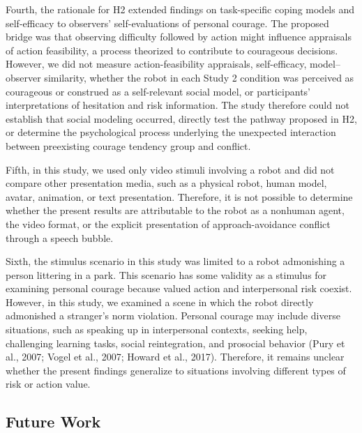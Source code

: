 \documentclass[
]{article}
\begin{document}
Fourth, the rationale for H2 extended findings on task-specific coping
models and self-efficacy to observers' self-evaluations of personal
courage. The proposed bridge was that observing difficulty followed by
action might influence appraisals of action feasibility, a process
theorized to contribute to courageous decisions. However, we did not
measure action-feasibility appraisals, self-efficacy, model--observer
similarity, whether the robot in each Study 2 condition was perceived as
courageous or construed as a self-relevant social model, or
participants' interpretations of hesitation and risk information. The
study therefore could not establish that social modeling occurred,
directly test the pathway proposed in H2, or determine the psychological
process underlying the unexpected interaction between preexisting
courage tendency group and conflict.

Fifth, in this study, we used only video stimuli involving a robot and
did not compare other presentation media, such as a physical robot,
human model, avatar, animation, or text presentation. Therefore, it is
not possible to determine whether the present results are attributable
to the robot as a nonhuman agent, the video format, or the explicit
presentation of approach-avoidance conflict through a speech bubble.

Sixth, the stimulus scenario in this study was limited to a robot
admonishing a person littering in a park. This scenario has some
validity as a stimulus for examining personal courage because valued
action and interpersonal risk coexist. However, in this study, we
examined a scene in which the robot directly admonished a stranger's
norm violation. Personal courage may include diverse situations, such as
speaking up in interpersonal contexts, seeking help, challenging
learning tasks, social reintegration, and prosocial behavior (Pury et
al., 2007; Vogel et al., 2007; Howard et al., 2017). Therefore, it
remains unclear whether the present findings generalize to situations
involving different types of risk or action value.

\subsection{Future Work}\label{future-work}
\end{document}
